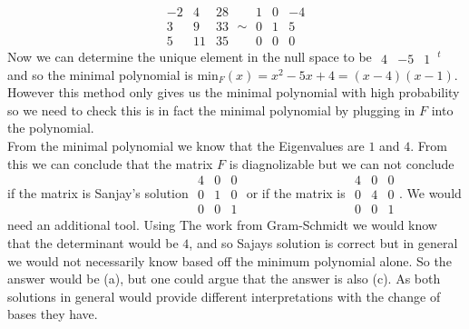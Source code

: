 \documentclass[12pt]{amsart}
\theoremstyle{definition}
\begin{document}
\begin{enumerate}
$$\boxed{\begin{matrix} 
-2 & 4 & 28\\
3 & 9 & 33\\
5 & 11 & 35
\end{matrix}}\sim \boxed{\begin{matrix} 
1 & 0 & -4\\
0 & 1 & 5\\
0 & 0 & 0
\end{matrix}}$$
Now we can determine the unique element in the null space to be $\boxed{\begin{matrix} 
4 & -5 & 1
\end{matrix}}\,^t$ and so the minimal polynomial is $\text{min}_F(x)=x^2-5x+4=(x-4)(x-1)$. However this method only gives us the minimal polynomial with high probability so we need to check this is in fact the minimal polynomial by plugging in $F$ into the polynomial.\\

From the minimal polynomial we know that the Eigenvalues are $1$ and $4$. From this we can conclude that the matrix $F$ is diagnolizable but we can not conclude if the matrix is Sanjay's solution $\boxed{\begin{matrix} 
4 & 0 & 0\\
0 & 1 & 0\\
0 & 0 & 1
\end{matrix}}$ or if the matrix is $\boxed{\begin{matrix} 
4 & 0 & 0\\
0 & 4 & 0\\
0 & 0 & 1
\end{matrix}}$. We would need an additional tool. Using The work from Gram-Schmidt we would know that the determinant would be $4$, and so Sajays solution is correct but in general we would not necessarily know based off the minimum polynomial alone. So the answer would be (a), but one could argue that the answer is also (c). As both solutions in general would provide different interpretations with the change of bases they have.\\


\end{enumerate}
\end{document}
